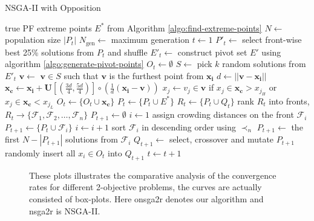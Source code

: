 \documentclass[journal]{IEEEtran}
\let\MYoriglatexcaption\caption
\renewcommand{\caption}[2][\relax]{\MYoriglatexcaption[#2]{#2}}
\begin{document}
\begin{algorithm}[tp]
\caption{NSGA-II with Opposition}
\label{algo:onsga2}
{\footnotesize
\begin{algorithmic}[1]
	\REQUIRE true PF extreme points $E^{\ast}$ from Algorithm \ref{algo:find-extreme-points}
	\STATE $N \leftarrow$ population size $|P_t|$
	\STATE $N_{\text{gen}} \leftarrow $ maximum generation
	\STATE $t \leftarrow 1$
		\STATE $P'_t \leftarrow$ select front-wise best 25\% solutions from $P_t$ and shuffle
		\STATE $E'_t \leftarrow$ construct pivot set $E'$ using algorithm \ref{algo:generate-pivot-points}
		\STATE $O_t \leftarrow \emptyset$
			\STATE $S \leftarrow$ pick $k$ random solutions from $E'_t$
			\STATE $\mathbf{v} \leftarrow$ $\mathbf{v} \in S$ such that $\mathbf{v}$ is the furthest point from $\mathbf{x_i}$
			\STATE $d \leftarrow ||\mathbf{v} - \mathbf{x_i}||$
			\STATE $\mathbf{x_c} \leftarrow \mathbf{x_i} + \mathbf{U}[(\frac{3d}{4}, \frac{5d}{4})] \circ (\frac{1}{d}(\mathbf{x_i} - \mathbf{v}))$
			\STATE $x_j \leftarrow v_j \in \mathbf{v}$ if $x_j \in \mathbf{x_c} > x_{j_H}$ or $x_j \in \mathbf{x_c} < x_{j_L}$ 
			\STATE $O_t \leftarrow \{O_t \cup \mathbf{x_c}\}$
		\ENDFOR
		\STATE $P_t \leftarrow \{P_t \cup  E^\ast\}$
		\STATE $R_t \leftarrow \{P_t \cup Q_t\}$
		\STATE rank $R_t$ into fronts, $R_t \rightarrow \{\mathcal{F}_1, \mathcal{F}_2, \ldots, \mathcal{F}_n\}$
		\STATE $P_{t+1} \leftarrow \emptyset$
		\STATE $i \leftarrow 1$
			\STATE assign crowding distances on the front $\mathcal{F}_i$
			\STATE $P_{t+1} \leftarrow \{P_t \cup \mathcal{F}_i\}$
			\STATE $i \leftarrow i + 1$
		\ENDWHILE
		\STATE sort $\mathcal{F}_i$ in descending order using $\prec_n$
		\STATE $P_{t+1} \leftarrow$ the first $N - |P_{t+1}|$ solutions from $\mathcal{F}_i$
		\STATE $Q_{t+1} \leftarrow$ select, crossover and mutate $P_{t+1}$
		\STATE randomly insert all $x_i \in O_t$ into $Q_{t+1}$
		\STATE $t \leftarrow t + 1$
	\ENDWHILE
\end{algorithmic}}
\end{algorithm}
%
%
\begin{figure*}[bp!]
	\centering
	\hfill
	\caption{These plots illustrates the comparative analysis of the convergence rates for different 2-objective problems, the curves are actually consisted of box-plots. Here onsga2r denotes our algorithm and nsga2r is NSGA-II.}
	\label{plot:onsga2r-hv-zdt}
\end{figure*}
%
\end{document}
